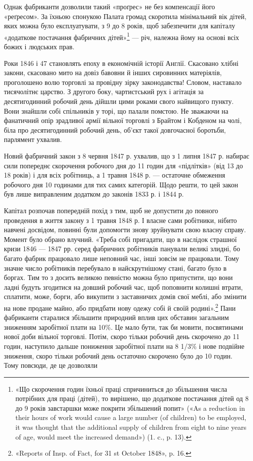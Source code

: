 Однак фабриканти дозволили такий «проґрес» не без компенсації
його «реґресом». За їхньою спонукою Палата громад скоротила
мінімальний вік дітей, яких можна було експлуатувати,
з 9 до 8 років, щоб забезпечити для капіталу «додаткове постачання
фабричних дітей»\footnote{
«Що скорочення годин їхньої праці спричиниться до збільшення
числа потрібних для праці (дітей), то вирішено, що додаткове постачання
дітей од 8 до 9 років завстаршки може покрити збільшений
попит» («As a reduction in their hours of work would cause a large number
(of children) to be employed, it was thought that the additional supply of
children from eight to nine years of age, would meet the increased demand»)
(1. c., p. 13).
} — річ, належна йому на основі всіх
божих і людських прав.

Роки 1846 і 47 становлять епоху в економічній історії Англії.
Скасовано хлібні закони, скасовано мито на довіз бавовни й
інших сировинних матеріялів, проголошено волю торговлі за
провідну зірку законодавства! Словом, наставало тисячолітнє
царство. З другого боку, чартистський рух і агітація за десятигодинний
робочий день дійшли цими роками свого найвищого
пункту. Вони знайшли собі спільників у торі, що палали помстою.
Не зважаючи на фанатичний опір зрадливої армії вільної торговлі
з Брайтом і Кобденом на чолі, біла про десятигодинний робочий
день, об’єкт такої довгочасної боротьби, парлямент ухвалив.

Новий фабричний закон з 8 червня 1847 р. ухвалив, що з
1 липня 1847 р. набирає сили попереднє скорочення робочого дня
до 11 годин для «підлітків» (від 13 до 18 років) і для всіх робітниць,
а 1 травня 1848 р. — остаточне обмеження робочого
дня 10 годинами для тих самих категорій. Щодо решти, то цей
закон був лише виправленим додатком до законів 1833 р. і 1844 р.

Капітал розпочав попередній похід з тим, щоб не допустити
до повного проведення в життя закону з 1 травня 1848 р. І власне
сами робітники, нібито навчені досвідом, повинні були допомогти
знову зруйнувати свою власну справу. Момент було обрано влучний.
«Треба собі пригадати, що в наслідок страшної кризи 1846 —
1847 рр. серед фабричних робітників панували великі злидні,
бо багато фабрик працювало лише неповний час, інші зовсім не
працювали. Тому значне число робітників перебувало в найскрутнішому
стані, багато було в боргах. Тим то з досить великою
певністю можна було припустити, що вони ладні будуть згодитися
на довший робочий час, щоб поповнити колишні втрати, сплатити,
може, борги, або викупити з заставничих домів свої меблі, або
змінити на нове продане майно, або придбати нову одежу собі й
своїй родині».\footnote{
«Reports of Insp. of Fact, for 31 st October 1848», p. 16.
} Пани фабриканти старалися збільшити природний
вплив цих обставин загальним зниженням заробітної плати
на 10\%. Це мало бути, так би мовити, посвятинами нової доби
вільної торговлі. Потім, скоро тільки робочий день скорочено
до 11 годин, наступило дальше пониження заробітної плати на
8 1/3\% і нове подвійне зниження, скоро тільки робочий день остаточно
скорочено було до 10 годин. Тому повсюди, де це дозволяли
\parbreak{}  %
